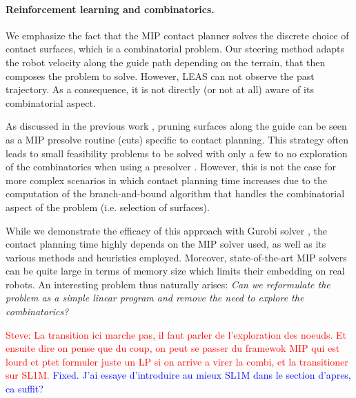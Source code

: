 \paragraph{Reinforcement learning and combinatorics.}

We emphasize the fact that the MIP contact planner solves the discrete choice of contact surfaces, which is a combinatorial problem.
Our steering method adapts the robot velocity along the guide path depending on the terrain, that then composes the problem to solve. 
However, LEAS can not observe the past trajectory. 
As a consequence, it is not directly (or not at all) aware of its combinatorial aspect. 

As discussed in the previous work \cite{sl1m_v2}, pruning surfaces along the guide can be seen as a MIP presolve routine (cuts) specific to contact planning.
This strategy often leads to small feasibility problems to be solved with only a few to no exploration of the combinatorics when using a presolver \cite{presolve_gurobi_2020}.
However, this is not the case for more complex scenarios in which contact planning time increases due to the computation of the branch-and-bound algorithm that handles the combinatorial aspect of the problem (i.e. selection of surfaces).

While we demonstrate the efficacy of this approach with Gurobi solver \cite{gurobi}, the contact planning time highly depends on the MIP solver used, as well as its various methods and heuristics employed.
Moreover, state-of-the-art MIP solvers can be quite large in terms of memory size which limits their embedding on real robots.
An interesting problem thus naturally arises: \textit{Can we reformulate the problem as a simple linear program and remove the need to explore the combinatorics?}


\textcolor{red}{Steve: La transition ici marche pas, il faut parler de l'exploration des noeuds. Et ensuite dire on pense que du coup, on peut se passer du framewok MIP qui est lourd et ptet formuler juste un LP si on arrive a virer la combi, et la transitioner sur SL1M.}
\textcolor{blue}{Fixed. J'ai essaye d'introduire au mieux SL1M dans le section d'apres, ca suffit?}

